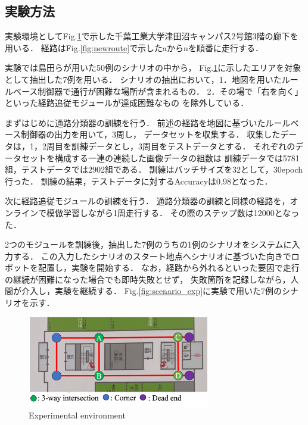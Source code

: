 \documentclass{sice-si}
\begin{document}
\subsection{実験方法}
実験環境としてFig.\ref{fig:cit3f}で示した千葉工業大学津田沼キャンパス2号館3階の廊下を用いる．
経路はFig.\ref{fig:newroute}で示したaからnを順番に走行する．\par
実験では島田らが用いた50例のシナリオの中から，
Fig.\ref{fig:cit3f}に示したエリアを対象として抽出した7例を用いる．
シナリオの抽出において，1．地図を用いたルールベース制御器で通行が困難な場所が含まれるもの．
2．その場で「右を向く」といった経路追従モジュールが達成困難なもの
を除外している．\par
まずはじめに通路分類器の訓練を行う．
前述の経路を地図に基づいたルールベース制御器の出力を用いて，3周し，
データセットを収集する．
収集したデータは，1，2周目を訓練データとし，3周目をテストデータとする．
それぞれのデータセットを構成する一連の連続した画像データの組数は
訓練データでは5781組，テストデータでは2902組である．
訓練はバッチサイズを32として，30epoch行った．
訓練の結果，テストデータに対するAccuracyは0.98となった．\par
次に経路追従モジュールの訓練を行う．
通路分類器の訓練と同様の経路を，オンラインで模倣学習しながら1周走行する．
その際のステップ数は12000となった．
\par
2つのモジュールを訓練後，抽出した7例のうちの1例のシナリオをシステムに入力する．
この入力したシナリオのスタート地点へシナリオに基づいた向きでロボットを配置し，実験を開始する．
なお，経路から外れるといった要因で走行の継続が困難になった場合でも即時失敗とせず，
失敗箇所を記録しながら，人間が介入し，実験を継続する．
Fig.\ref{fig:scenario_exp}に実験で用いた7例のシナリオを示す．
\begin{figure}[htbp]
    \centering
     \includegraphics[height=40mm,width=80mm]{./figs/cit3f.png}
     \caption{Experimental environment}\label{fig:cit3f}
\end{figure}
\end{document}
